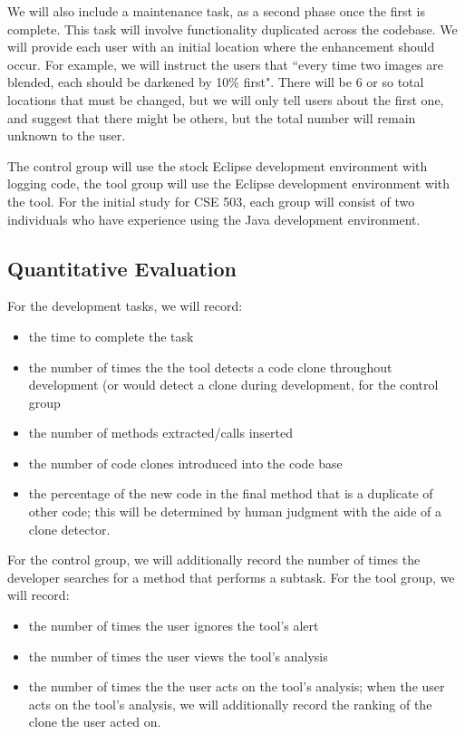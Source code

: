 \documentclass[nocopyrightspace,10pt]{sigplanconf}
\newcommand{\todo}[1]{{\bfseries [[#1]]}}
\renewcommand{\todo}[1]{\relax}
\begin{document}
We will also include a maintenance task, as a second phase once the first is complete.  This task will involve functionality duplicated across the codebase.  We will provide each user with an initial location where the enhancement should occur.  For example, we will instruct the users that ``every time two images are blended, each should be darkened by 10\% first".  There will be 6 or so total locations that must be changed, but we will only tell users about the first one, and suggest that there might be others, but the total number will remain unknown to the user.


The control group will use the stock Eclipse development
environment with logging code, the tool group will use the Eclipse development
environment with the tool. For the initial study for CSE 503, each
group will consist of two individuals who have experience using the
Java development environment.  


\subsection{Quantitative Evaluation}
For the development tasks, we will record:

\begin{itemize}
  \item the time to complete the task
  \item the number of times the the tool detects a code clone
    throughout development (or would detect a clone during
    development, for the control group
  \item the number of methods extracted/calls inserted
  \item the number of code clones introduced into the code base
  \item the percentage of the new code in the final method that is a
    duplicate of other code; this will be determined by human
    judgment with the aide of a clone detector.
\end{itemize}

\noindent For the control group, we will additionally record the
number of times the developer searches for a method that performs a
subtask. For the tool group, we will record:
\begin{itemize}
  \item the number of times the user ignores the tool's alert
  \item the number of times the user views the tool's analysis
  \item the number of times the the user acts on the tool's analysis;
    when the user acts on the tool's analysis, we will additionally
    record the ranking of the clone the user acted on.
\end{itemize}
\end{document}
